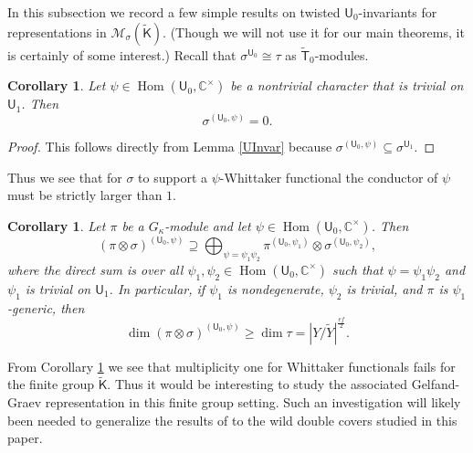\documentclass[10pt, letterpaper]{amsart}
\theoremstyle{plain}
\newtheorem{Cor}[equation]{Corollary}
\theoremstyle{definition}
\numberwithin{equation}{section}
\newcommand{\Yt}{\widetilde{Y}}
\newcommand{\Hom}{\operatorname{Hom}}
\newcommand{\Kf}{\mathsf{K}}
\newcommand{\Uf}{\mathsf{U}}
\newcommand{\Kft}{\widetilde{\mathsf{K}}}
\newcommand{\Tft}{\widetilde{\mathsf{T}}}
\begin{document}


In this subsection we record a few simple results on twisted ${\Uf}_{0}$-invariants for representations in $\mathcal{M}_{\sigma}(\widetilde{{\Kf}})$. (Though we will not use it for our main theorems, it is certainly of some interest.) Recall that $\sigma^{{\Uf}_{0}}\cong \tau$ as $\Tft_{0}$-modules.


\begin{Cor}
	Let $\psi\in\Hom({\Uf}_{0},\mathbb{C}^{\times})$ be a nontrivial character that is trivial on ${\Uf}_{1}$. Then
	\begin{equation*}
		\sigma^{({\Uf}_{0},\psi)}=0. 
	\end{equation*}
\end{Cor}

\begin{proof}
	This follows directly from Lemma \ref{UInvar} because $\sigma^{({\Uf}_{0},\psi)}\subseteq \sigma^{\Uf_1}$.
\end{proof}

Thus we see that for $\sigma$ to support a $\psi$-Whittaker functional the conductor of $\psi$ must be strictly larger than $1$.


\begin{Cor}\label{WhitMult}
	Let $\pi$ be a $G_{\kappa}$-module and let $\psi\in\Hom({\Uf}_{0},\mathbb{C}^{\times})$. Then 
	\begin{equation*}
		(\pi\otimes \sigma)^{({\Uf}_{0},\psi)}\supseteq \bigoplus_{\psi=\psi_{1}\psi_{2}}\pi^{({\Uf}_{0},\psi_{1})}\otimes \sigma^{({\Uf}_{0},\psi_{2})},
	\end{equation*}
    where the direct sum is over all $\psi_{1},\psi_{2}\in\Hom({\Uf}_{0},\mathbb{C}^{\times})$ such that $\psi=\psi_{1}\psi_{2}$ and $\psi_{1}$ is trivial on ${\Uf}_{1}$. 
    In particular, if $\psi_{1}$ is nondegenerate, $\psi_{2}$ is trivial, and $\pi$ is $\psi_{1}$-generic, then
	\begin{equation*}
		\dim(\pi\otimes \sigma)^{({\Uf}_{0},\psi)}\geq \dim\tau=\left|Y\slash \Yt\right|^{\frac{ef}{2}}.
	\end{equation*}
\end{Cor}

From Corollary \ref{WhitMult} we see that multiplicity one for Whittaker functionals fails for the finite group $\Kft$. Thus it would be interesting to study the associated Gelfand-Graev representation in this finite group setting. Such an investigation will likely been needed to generalize the results of \cite{GGK24,GGK25} to the wild double covers studied in this paper.
\end{document}
